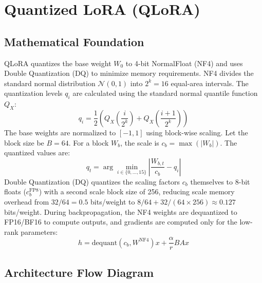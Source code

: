 \newpage
\section{Quantized LoRA (QLoRA)}

\subsection{Mathematical Foundation}
QLoRA quantizes the base weight $W_0$ to 4-bit NormalFloat (NF4) and uses Double Quantization (DQ) to minimize memory requirements.
NF4 divides the standard normal distribution $\mathcal{N}(0, 1)$ into $2^k=16$ equal-area intervals. The quantization levels $q_i$ are calculated using the standard normal quantile function $Q_X$:
\begin{equation}
  q_i = \frac{1}{2} \left( Q_X\left(\frac{i}{2^k}\right) + Q_X\left(\frac{i+1}{2^k}\right) \right)
\end{equation}
The base weights are normalized to $[-1, 1]$ using block-wise scaling. Let the block size be $B=64$. For a block $W_b$, the scale is $c_b = \max(|W_b|)$. The quantized values are:
\begin{equation}
  q_t = \arg\min_{i \in \{0, \dots, 15\}} \left| \frac{W_{b,t}}{c_b} - q_i \right|
\end{equation}
Double Quantization (DQ) quantizes the scaling factors $c_b$ themselves to 8-bit floats ($c_b^{\text{FP8}}$) with a second scale block size of 256, reducing scale memory overhead from $32/64 = 0.5$ bits/weight to $8/64 + 32/(64 \times 256) \approx 0.127$ bits/weight.
During backpropagation, the NF4 weights are dequantized to FP16/BF16 to compute outputs, and gradients are computed only for the low-rank parameters:
\begin{equation}
  h = \text{dequant}(c_b, W^{\text{NF4}}) x + \frac{\alpha}{r} B A x
\end{equation}

\subsection{Architecture Flow Diagram}

